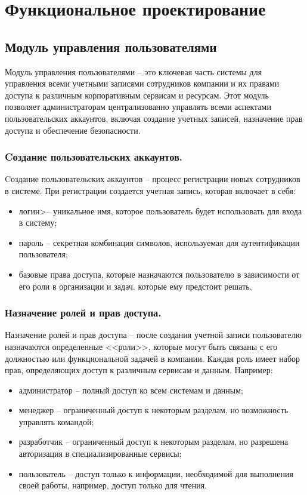 \section{Функциональное проектирование}

\subsection{Модуль управления пользователями}
\label{sec:user_management_functionality}

Модуль управления пользователями -- это ключевая часть системы для управления всеми учетными записями сотрудников компании и их правами доступа к различным корпоративным сервисам и ресурсам. Этот модуль позволяет администраторам централизованно управлять всеми аспектами пользовательских аккаунтов, включая создание учетных записей, назначение прав доступа и обеспечение безопасности.

\subsubsection{Cоздание пользовательских аккаунтов.} Cоздание пользовательских аккаунтов -- процесс регистрации новых сотрудников в системе. При регистрации создается учетная запись, которая включает в себя:
\begin{itemize}
    \item логин>-- уникальное имя, которое пользователь будет использовать для входа в систему;
    \item пароль -- секретная комбинация символов, используемая для аутентификации пользователя;
    \item базовые права доступа, которые назначаются пользователю в зависимости от его роли в организации и задач, которые ему предстоит решать.
\end{itemize}

\subsubsection{Назначение ролей и прав доступа.} Назначение ролей и прав доступа -- после создания учетной записи пользователю назначаются определенные <<роли>>, которые могут быть связаны с его должностью или функциональной задачей в компании. Каждая роль имеет набор прав, определяющих доступ к различным сервисам и данным. Например:
\begin{itemize}
    \item администратор -- полный доступ ко всем системам и данным;
    \item менеджер -- ограниченный доступ к некоторым разделам, но возможность управлять командой;
    \item разработчик -- ограниченный доступ к некоторым разделам, но разрешена авторизация в специализированные сервисы;
    \item пользователь -- доступ только к информации, необходимой для выполнения своей работы, например, доступ только для чтения.
\end{itemize}

